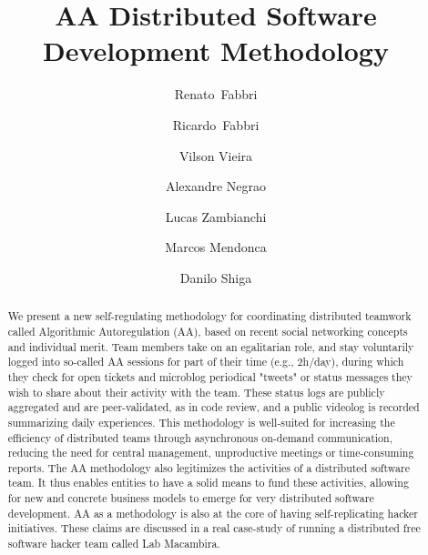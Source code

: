 \title{%
AA Distributed Software Development Methodology
}

\author{%
Renato~Fabbri \and Ricardo~Fabbri \and Vilson Vieira \and Alexandre Negrao \and Lucas Zambianchi
\and Marcos Mendonca \and Danilo Shiga
}

\maketitle


\begin{abstract}
We present a new self-regulating methodology for coordinating
distributed teamwork called Algorithmic Autoregulation (AA),  based on recent social
networking concepts and individual merit. Team members take on an egalitarian role, and stay
voluntarily logged into so-called AA sessions for part of their time (e.g.,
2h/day), during which they check for open tickets and microblog periodical
"tweets" or status messages they wish to share about their activity with the
team. These status logs are publicly aggregated and are peer-validated,
as in code review, and a public videolog is recorded summarizing daily experiences.
This methodology is well-suited for increasing the efficiency of distributed
teams through asynchronous on-demand communication, reducing the need for
central management, unproductive meetings or time-consuming reports.  The AA
methodology also legitimizes the activities of a distributed software team.  It
thus enables entities to have a solid means to fund these activities, allowing
for new and concrete business models to emerge for very distributed software
development. AA as a methodology is also at the core of having self-replicating
hacker initiatives. These claims are discussed in a real case-study of running a distributed
free software hacker team called Lab Macambira.
\end{abstract}

